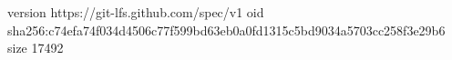 version https://git-lfs.github.com/spec/v1
oid sha256:c74efa74f034d4506c77f599bd63eb0a0fd1315c5bd9034a5703cc258f3e29b6
size 17492
